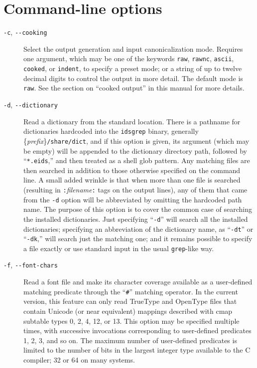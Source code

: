 \documentclass[twocolumn]{report}
\begin{document}

\section{Command-line options}

\begin{description}

\item[\texttt{-c}, \texttt{-{}-cooking}]
Select the output generation and input canonicalization mode.  Requires one
argument, which may be one of the keywords \texttt{raw}, \texttt{rawnc},
\texttt{ascii}, \texttt{cooked}, or \texttt{indent}, to specify a preset
mode; or a string of up to twelve decimal digits to control the output in
more detail.  The default mode is \texttt{raw}.  See the
section on ``cooked output'' in this manual for more details.

\item[\texttt{-d}, \texttt{-{}-dictionary}]
Read a dictionary
from the standard location.  There is a pathname for dictionaries hardcoded
into the \texttt{idsgrep} binary, generally
\{\emph{prefix}\}\texttt{/share/dict}, and if this option is given, its
argument (which may be empty) will be appended to the dictionary directory
path, followed by ``\texttt{*.eids},'' and then treated as a shell glob
pattern.  Any matching files are then searched in addition to those
otherwise specified on the command line.  A small added wrinkle is that when
more than one file is searched (resulting in
\texttt{:}\textit{filename}\texttt{:} tags on the output lines), any of them
that came from the \texttt{-d} option will be abbreviated by omitting the
hardcoded path name.  The purpose of this option is to cover the common case
of searching the installed dictionaries.  Just specifying ``\texttt{-d}''
will search all the installed dictionaries; specifying an abbreviation of
the dictionary name, as ``\texttt{-dt}'' or ``\texttt{-dk},'' will search
just the matching one; and it remains possible to specify a file exactly or
use standard input in the usual \texttt{grep}-like way.

\item[\texttt{-f}, \texttt{-{}-font-chars}]
Read a font file and make its character coverage available as a user-defined
matching predicate through the ``\texttt{\#}'' matching operator.  In the
current version, this feature can only read TrueType and OpenType files that
contain Unicode (or near equivalent) mappings described with cmap subtable
types 0, 2, 4, 12, or 13.  This option may be specified multiple times, with
successive invocations corresponding to user-defined predicates 1, 2, 3, and
so on.  The maximum number of user-defined predicates is limited to the
number of bits in the largest integer type available to the C compiler; 32
or 64 on many systems.


\end{description}
\end{document}
